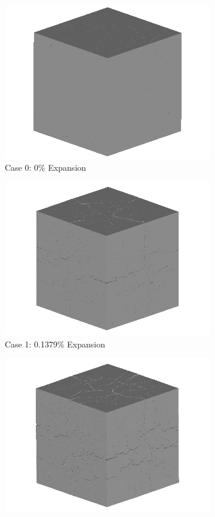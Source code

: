 \begin{figure}[!h]
\centering

    \begin{subfigure}{.5\textwidth}
      \centering
      \includegraphics[width=.8\linewidth]{Files/exp_3D/ASR/A30Undamaged.png}
    \caption{Case 0: 0\% Expansion}
    \end{subfigure}%
    \begin{subfigure}{.5\textwidth}
      \centering
      \includegraphics[width=.8\linewidth]{Files/exp_3D/DEF/A30X0C_1_3d.png}
    \caption{Case 1: 0.1379\% Expansion}
    \end{subfigure}
    \begin{subfigure}{.5\textwidth}
      \centering
      \includegraphics[width=.8\linewidth]{Files/exp_3D/DEF/A30X0C_2_3d.png}

\end{subfigure}
\end{figure}

